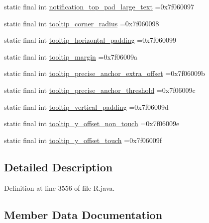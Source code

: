 \begin{DoxyCompactItemize}
\item 
static final int \mbox{\hyperlink{classcom_1_1example_1_1trainawearapplication_1_1_r_1_1dimen_aa305b3727264504b8fcb0244f2ddd322}{notification\+\_\+top\+\_\+pad\+\_\+large\+\_\+text}} =0x7f060097
\item 
static final int \mbox{\hyperlink{classcom_1_1example_1_1trainawearapplication_1_1_r_1_1dimen_a24ce35d20d2c633b36e4e98a21f820c1}{tooltip\+\_\+corner\+\_\+radius}} =0x7f060098
\item 
static final int \mbox{\hyperlink{classcom_1_1example_1_1trainawearapplication_1_1_r_1_1dimen_afe86de8e5123ccd9b256073286cba023}{tooltip\+\_\+horizontal\+\_\+padding}} =0x7f060099
\item 
static final int \mbox{\hyperlink{classcom_1_1example_1_1trainawearapplication_1_1_r_1_1dimen_a202836507ab2bae012f7950fcce07e86}{tooltip\+\_\+margin}} =0x7f06009a
\item 
static final int \mbox{\hyperlink{classcom_1_1example_1_1trainawearapplication_1_1_r_1_1dimen_adb655fd6ba00fb3a8771dbcbc56492a2}{tooltip\+\_\+precise\+\_\+anchor\+\_\+extra\+\_\+offset}} =0x7f06009b
\item 
static final int \mbox{\hyperlink{classcom_1_1example_1_1trainawearapplication_1_1_r_1_1dimen_aae123f8608a36efa189134b229a66b59}{tooltip\+\_\+precise\+\_\+anchor\+\_\+threshold}} =0x7f06009c
\item 
static final int \mbox{\hyperlink{classcom_1_1example_1_1trainawearapplication_1_1_r_1_1dimen_ad5e76d433253ea9861a9abf9288d0d11}{tooltip\+\_\+vertical\+\_\+padding}} =0x7f06009d
\item 
static final int \mbox{\hyperlink{classcom_1_1example_1_1trainawearapplication_1_1_r_1_1dimen_a593c19934fba3183d3b7fb48b85c89b8}{tooltip\+\_\+y\+\_\+offset\+\_\+non\+\_\+touch}} =0x7f06009e
\item 
static final int \mbox{\hyperlink{classcom_1_1example_1_1trainawearapplication_1_1_r_1_1dimen_ae9166e3eb67facc4394aae9b25003cb9}{tooltip\+\_\+y\+\_\+offset\+\_\+touch}} =0x7f06009f
\end{DoxyCompactItemize}


\subsection{Detailed Description}


Definition at line 3556 of file R.\+java.



\subsection{Member Data Documentation}
\mbox{\label{classcom_1_1example_1_1trainawearapplication_1_1_r_1_1dimen_aeb64eab7955e2b9e571805aa06252df6}} 
